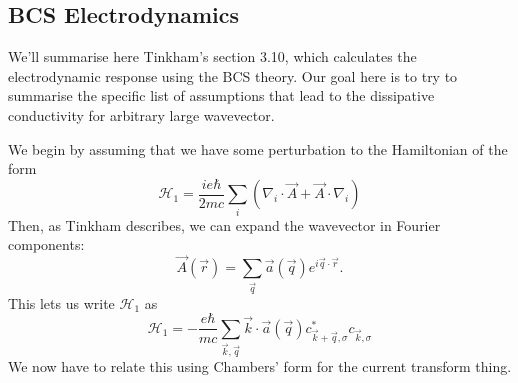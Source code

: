 \documentclass[../main.tex]{subfiles}
\begin{document}
	\subsection{BCS Electrodynamics} \label{subsec:bcscalc}

	We'll summarise here Tinkham's section 3.10, which calculates the electrodynamic response using the BCS theory.
	Our goal here is to try to summarise the specific list of assumptions that lead to the dissipative conductivity for arbitrary large wavevector.

	We begin by assuming that we have some perturbation to the Hamiltonian of the form
	\begin{equation}
		\mathcal{H}_1 = \frac{ie\hbar}{2 m c} \sum_i \left( \nabla_i \cdot \vec{A} + \vec{A} \cdot \nabla_i \right)
	\end{equation}
	Then, as Tinkham describes, we can expand the wavevector in Fourier components: 
	\begin{equation}
		\vec{A}(\vec{r}) = \sum_{\vec{q}} \vec{a}(\vec{q}) e^{i \vec{q} \cdot \vec{r}}.
	\end{equation}
	This lets us write $\mathcal{H}_1$ as
	\begin{equation}
		\mathcal{H}_1 = - \frac{e \hbar}{m c}\sum_{\vec{k}, \vec{q}} \vec{k} \cdot \vec{a}(\vec{q}) c^\ast_{\vec{k} + \vec{q}, \sigma} c_{\vec{k}, \sigma}
	\end{equation}
	We now have to relate this using Chambers' form for the current transform thing.
\end{document}
